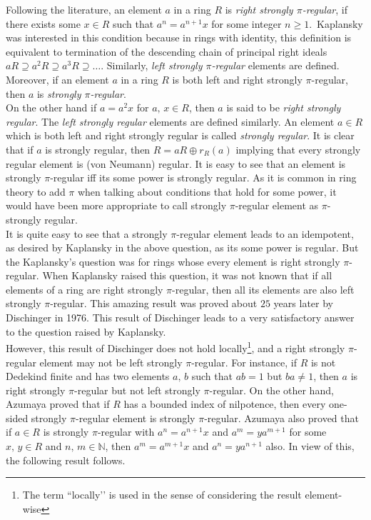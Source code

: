 \documentclass[12pt]{article}
\theoremstyle{plain}
\theoremstyle{definition}
\begin{document}
	 \par Following the literature, an element $a$ in a ring $R$ is \emph{right strongly $\pi$-regular}, if there exists some $x \in R$ such that $a^n= a^{n+1}x$ for some integer $n \geq 1$.\ Kaplansky was interested in this condition because in rings with identity, this definition is equivalent to termination of the descending chain of principal right ideals $aR\supseteq a^2R\supseteq a^3R\supseteq \ldots$. Similarly, \emph{left strongly $\pi$-regular} elements are defined. Moreover, if an element $a$ in a ring $R$ is both left and right strongly $\pi$-regular, then $a$ is \emph{strongly $\pi$-regular}.\\
	 
	 On the other hand if $a = a^2x$ for $a,\,x \in R$, then $a$ is said to be \emph{right strongly regular}. The \emph{left strongly regular} elements are defined similarly. An element $a \in R$ which is both left and right strongly regular is called \emph{strongly regular}. It is clear that if $a$ is strongly regular, then $R = aR \oplus r_R(a)$ implying that every strongly regular element is (von Neumann) regular. It is easy to see that an element is strongly $\pi$-regular iff its some power is strongly regular. As it is common in ring theory to add $\pi$ when talking about conditions that hold for some power, it would have been more appropriate to call strongly $\pi$-regular element as $\pi$-strongly regular. \\
	 
	 It is quite easy to see that a strongly $\pi$-regular element leads to an idempotent, as desired by Kaplansky in the above question, as its some power is regular. But the  Kaplansky's question was for rings whose every element is right strongly $\pi$-regular.
	When Kaplansky raised this question, it was not known that if all elements of a ring are right strongly $\pi$-regular, then all its elements are also left strongly $\pi$-regular. This amazing result was proved about $25$ years later by Dischinger \cite{Dischinger} in 1976. This result of Dischinger \cite{Dischinger} leads to a very satisfactory answer to the question raised by Kaplansky.\\
	
	 However, this result of Dischinger does not hold locally{\footnote{The term “locally’’ is used in the sense of considering the result element-wise}}, and a right strongly $\pi$-regular element may not be left strongly $\pi$-regular. For instance, if $R$ is not Dedekind finite and has two elements $a, \,b$ such that $ab = 1$ but $ba \neq 1$, then $a$ is right strongly $\pi$-regular but not left strongly $\pi$-regular. On the other hand, Azumaya \cite[Theorem 4]{Az} proved that if $R$ has a bounded index of nilpotence, then every one-sided strongly $\pi$-regular element is strongly $\pi$-regular. Azumaya \cite[Lemma 3]{Az} also proved that if $a \in R$ is strongly $\pi$-regular with $a^n = a^{n+1}x$ and $a^m = ya^{m+1}$ for some $x,\,y \in R$ and $n,\,m \in \mathbb{N}$, then $a^m = a^{m+1}x$ and $a^n = ya^{n+1}$ also. In view of this, the following result follows.
	
\end{document}
